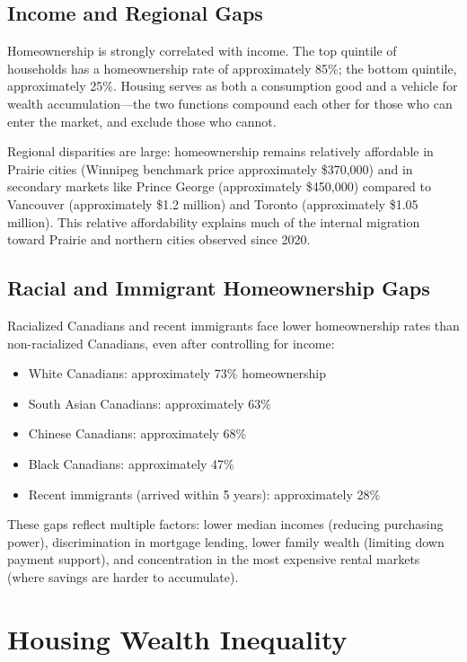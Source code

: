 \subsection{Income and Regional Gaps}

Homeownership is strongly correlated with income. The top quintile of households has a homeownership rate of approximately 85\%; the bottom quintile, approximately 25\%. Housing serves as both a consumption good and a vehicle for wealth accumulation---the two functions compound each other for those who can enter the market, and exclude those who cannot.

Regional disparities are large: homeownership remains relatively affordable in Prairie cities (Winnipeg benchmark price approximately \$370,000) and in secondary markets like Prince George (approximately \$450,000) compared to Vancouver (approximately \$1.2 million) and Toronto (approximately \$1.05 million). This relative affordability explains much of the internal migration toward Prairie and northern cities observed since 2020.

\subsection{Racial and Immigrant Homeownership Gaps}

Racialized Canadians and recent immigrants face lower homeownership rates than non-racialized Canadians, even after controlling for income:

\begin{itemize}
  \item White Canadians: approximately 73\% homeownership
  \item South Asian Canadians: approximately 63\%
  \item Chinese Canadians: approximately 68\%
  \item Black Canadians: approximately 47\%
  \item Recent immigrants (arrived within 5 years): approximately 28\%
\end{itemize}

These gaps reflect multiple factors: lower median incomes (reducing purchasing power), discrimination in mortgage lending, lower family wealth (limiting down payment support), and concentration in the most expensive rental markets (where savings are harder to accumulate).

\section{Housing Wealth Inequality}

